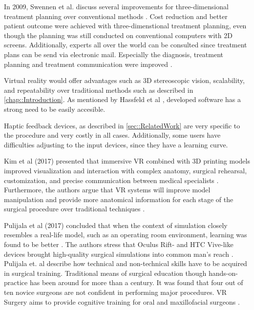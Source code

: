 In 2009, Swennen et al. discuss several improvements for three-dimensional treatment planning over conventional methods \cite{swennen2009three}.
Cost reduction and better patient outcome were achieved with three-dimenstional treatment planning, even though the planning was still conducted on conventional computers with 2D screens.
Additionally, experts all over the world can be consulted since treatment plans can be send via electronic mail.
Especially the diagnosis, treatment planning and treatment communication were improved \cite{swennen2009three}.

Virtual reality would offer advantages such as 3D stereoscopic vision, scalability, and repeatability over traditional methods such as described in \ref{chap::Introduction}.
As mentioned by Hassfeld et al \cite{HASSFELD20012}, developed software has a strong need to be easily accesible.

Haptic feedback devices, as described in \ref{sec::RelatedWork} are very specific to the procedure and very costly in all cases.
Additionally, some users have difficulties adjusting to the input devices, since they have a learning curve.

Kim et al (2017) presented that immersive VR combined with 3D printing models improved visualization and interaction with complex anatomy, surgical rehearsal, customization, and precise communication between medical specialists \cite{.2017}.
Furthermore, the authors argue that VR systems will improve model manipulation and provide more anatomical information for each stage of the surgical procedure over traditional techniques \cite{.2017}.

Pulijala et al (2017) concluded that when the context of simulation closely resembles a real-life model, such as an operating room environment, learning was found to be better \cite{Pulijala.2017}.
The authors stress that Oculus Rift- and HTC Vive-like devices brought high-quality surgical simulations into common man’s reach \cite{Pulijala.2017}.
\newline
Pulijala et. al describe how technical and non-technical skills have to be acquired in surgical training.
Traditional means of surgical education though hands-on-practice has been around for more than a century.
It was found that four out of ten novice surgeons are not confident in performing major procedures.
VR Surgery aims to provide cognitive training for oral and maxillofacial surgeons \cite{RN68}.

